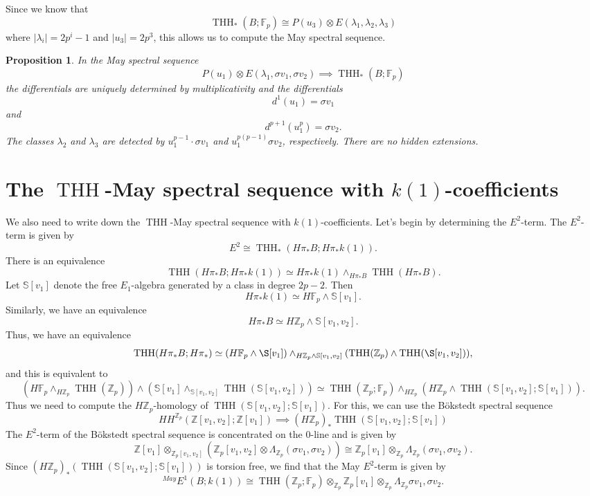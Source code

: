 \documentclass[12pt]{amsart}
\newcommand{\Z}{\mathbb{Z}}
\newcommand{\F}{\mathbb{F}}
\newcommand{\bbS}{\mathbb{S}}
\DeclareMathOperator{\THH}{THH}
\newtheorem{prop}[equation]{Proposition}
\theoremstyle{definition}
\numberwithin{equation}{section}
\numberwithin{figure}{section}
\begin{document}
Since we know that 
\[
\THH_*(B;\F_p)\cong P(u_3)\otimes E(\lambda_1, \lambda_2, \lambda_3)
\]
where $|\lambda_i| = 2p^i-1$ and $|u_3|=2p^3$, this allows us to compute the May spectral sequence. 

\begin{prop}
	In the May spectral sequence
	\[
	P(u_1)\otimes E(\lambda_1, \sigma v_1, \sigma v_2)\implies \THH_*(B;\F_p)
	\]
	the differentials are uniquely determined by multiplicativity and the differentials
	\[
	d^1(u_1) = \sigma v_1
	\]
	and 
	\[
	d^{p+1}(u_1^p) = \sigma v_2. 
	\]
	The classes $\lambda_2$ and $\lambda_3$ are detected by $u_1^{p-1}\cdot\sigma v_1$ and $u_1^{p(p-1)}\sigma v_2$, respectively. There are no hidden extensions.  
\end{prop}


\section{The $\THH$-May spectral sequence with $k(1)$-coefficients}

We also need to write down the $\THH$-May spectral sequence with $k(1)$-coefficients. Let's begin by determining the $E^2$-term. The $E^2$-term is given by 
\[
E^2\cong \THH_*(H\pi_*B; H\pi_*k(1)). 
\]
There is an equivalence 
\[
\THH(H\pi_*B; H\pi_*k(1))\simeq H\pi_*k(1)\wedge_{H\pi_*B}\THH(H\pi_*B). 
\]
Let $\bbS[v_1]$ denote the free $E_1$-algebra generated by a class in degree $2p-2$. Then 
\[
H\pi_*k(1)\simeq H\F_p\wedge \bbS[v_1].
\]
Similarly, we have an equivalence
\[
H\pi_*B\simeq H\Z_p\wedge \bbS[v_1,v_2].
\]
Thus, we have an equivalence 
\[
\THH(H\pi_*B; H\pi_*)\simeq (H\F_p\wedge \S[v_1])\wedge_{H\Z_p\wedge \bbS[v_1,v_2]}(\THH(\Z_p)\wedge \THH(\S[v_1,v_2])),
\]
and this is equivalent to 
\[
(H\F_p\wedge_{H\Z_p}\THH(\Z_p))\wedge(\bbS[v_1]\wedge_{\bbS[v_1,v_2]}\THH(\bbS[v_1,v_2]))\simeq \THH(\Z_p;\F_p)\wedge_{H\Z_p}(H\Z_p\wedge \THH(\bbS[v_1,v_2]; \bbS[v_1])).
\]
Thus we need to compute the $H\Z_p$-homology of $\THH(\bbS[v_1,v_2]; \bbS[v_1])$. For this, we can use the B\"okstedt spectral sequence
\[
HH^{\Z_p}(\Z[v_1,v_2];\Z[v_1])\implies (H\Z_p)_*\THH(\bbS[v_1,v_2]; \bbS[v_1])
\]
The $E^2$-term of the B\"okstedt spectral sequence is concentrated on the 0-line and is given by 
\[
\Z[v_1]\otimes_{\Z_p[v_1,v_2]}(\Z_p[v_1,v_2]\otimes \Lambda_{\Z_p}(\sigma v_1, \sigma v_2))\cong \Z_p[v_1]\otimes_{\Z_p} \Lambda_{\Z_p}(\sigma v_1, \sigma v_2).
\]
Since $(H\Z_p)_*(\THH(\bbS[v_1,v_2];\bbS[v_1]))$ is torsion free, we find that the May $E^2$-term is given by 
\[
\mbox{}^{May}E^1(B;k(1))\cong \THH(\Z_p;\F_p)\otimes_{\Z_p}\Z_p[v_1]\otimes_{\Z_p}\Lambda_{\Z_p}\sigma v_1, \sigma v_2. 
\]
\end{document}
